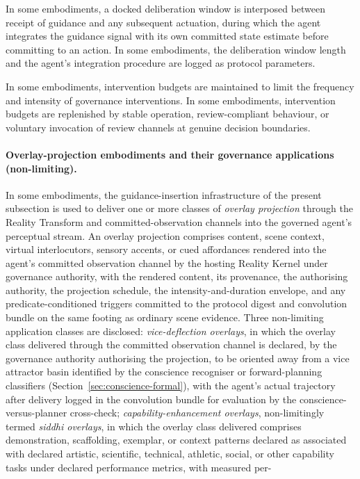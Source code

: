 \documentclass[a4paper,12pt]{article}
\newcommand{\cb}{convolution bundle\xspace}
\newcommand{\RT}{Reality Transform\xspace}
\begin{document}
In some embodiments, a docked deliberation window is interposed
between receipt of guidance and any subsequent actuation, during which
the agent integrates the guidance signal with its own committed state
estimate before committing to an action. In some embodiments, the
deliberation window length and the agent's integration procedure are
logged as protocol parameters.

In some embodiments, intervention budgets are maintained to limit the
frequency and intensity of governance interventions. In some
embodiments, intervention budgets are replenished by stable operation,
review-compliant behaviour, or voluntary invocation of review channels
at genuine decision boundaries.

\paragraph{Overlay-projection embodiments and their governance
  applications (non-limiting).}
In some embodiments, the guidance-insertion infrastructure of the
present subsection is used to deliver one or more classes of
\emph{overlay projection} through the \RT and committed-observation
channels into the governed agent's perceptual stream. An overlay
projection comprises content, scene context, virtual interlocutors,
sensory accents, or cued affordances rendered into the agent's
committed observation channel by the hosting Reality Kernel under
governance authority, with the rendered content, its provenance,
the authorising authority, the projection schedule, the
intensity-and-duration envelope, and any predicate-conditioned
triggers committed to the protocol digest and \cb on the same
footing as ordinary scene evidence. Three non-limiting application
classes are disclosed: \emph{vice-deflection overlays}, in which
the overlay class delivered through the committed observation
channel is declared, by the governance authority authorising the
projection, to be oriented away from a vice attractor basin
identified by the conscience recogniser or forward-planning
classifiers (Section~\ref{sec:conscience-formal}), with the
agent's actual trajectory after delivery logged in the \cb for
evaluation by the conscience-versus-planner cross-check;
\emph{capability-enhancement overlays}, non-limitingly termed
\emph{siddhi overlays}, in which the overlay class delivered
comprises demonstration, scaffolding, exemplar, or context
patterns declared as associated with declared artistic,
scientific, technical, athletic, social, or other capability
tasks under declared performance metrics, with measured per-
\end{document}
